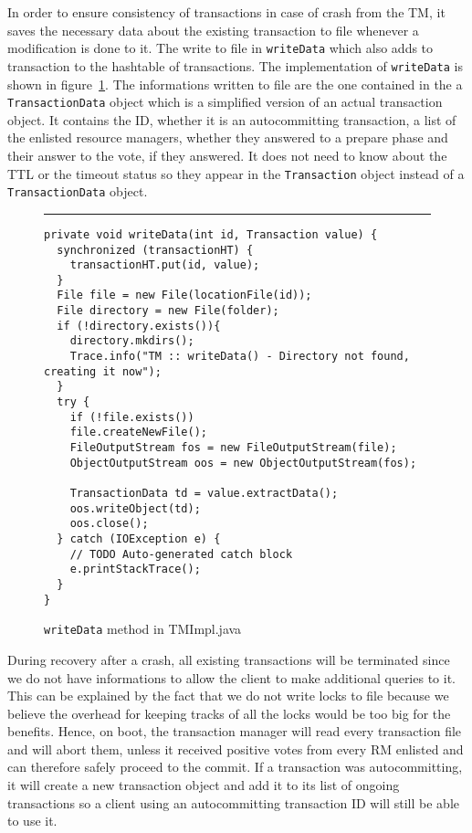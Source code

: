 \documentclass[12pt]{article}
\theoremstyle{plain}%
\theoremstyle{definition}
\theoremstyle{remark}
\newcommand{\java}[1]{{\lstinline!#1!}}
\newenvironment{figureone}[1]{%
  \def\deffigurecaption{#1}%
  \begin{figure}[htbp]%
  \begin{center}%
  \begin{minipage}{\columnwidth}%
  \hrule \vspace*{2ex}%
}{%
  \end{minipage}%
  \end{center}%
  \caption{\deffigurecaption}%
  \end{figure}%
}
\begin{document}
In order to ensure consistency of transactions in case of crash from the TM,
it saves the necessary data about the existing transaction to file whenever
a modification is done to it. The write to file in \java{writeData} which
also adds to transaction to the hashtable of transactions. The implementation
of \java{writeData} is shown in figure~\ref{fig:writeData}. The informations
written to file are the one contained in the a \java{TransactionData} object
which is a simplified version of an actual transaction object. It contains the
ID, whether it is an autocommitting transaction, a list of the enlisted 
resource managers, whether they answered to a prepare phase and their answer 
to the vote, if they answered. It does not need to know about the TTL or the
timeout status so they appear in the \java{Transaction} object instead of a 
\java{TransactionData} object.

\begin{figureone}{\java{writeData} method in TMImpl.java \label{fig:writeData}}
\begin{lstlisting}
private void writeData(int id, Transaction value) {
  synchronized (transactionHT) {
    transactionHT.put(id, value);
  }
  File file = new File(locationFile(id));
  File directory = new File(folder);
  if (!directory.exists()){ 
    directory.mkdirs();
    Trace.info("TM :: writeData() - Directory not found, creating it now");
  }
  try {
    if (!file.exists())
    file.createNewFile(); 
    FileOutputStream fos = new FileOutputStream(file);
    ObjectOutputStream oos = new ObjectOutputStream(fos);

    TransactionData td = value.extractData();
    oos.writeObject(td);
    oos.close();
  } catch (IOException e) {
    // TODO Auto-generated catch block
    e.printStackTrace();
  }
}
\end{lstlisting}
\end{figureone}

During recovery after a crash, all existing transactions will be terminated
since we do not have informations to allow the client to make additional
queries to it. This can be explained by the fact that we do not write
locks to file because we believe the overhead for keeping tracks of all
the locks would be too big for the benefits. Hence, on boot, the transaction
manager will read every transaction file and will abort them, unless it
received positive votes from every RM enlisted and can therefore safely
proceed to the commit. If a transaction was autocommitting, it will create
a new transaction object and add it to its list of ongoing transactions
so a client using an autocommitting transaction ID will still be able to
use it.
\end{document}
